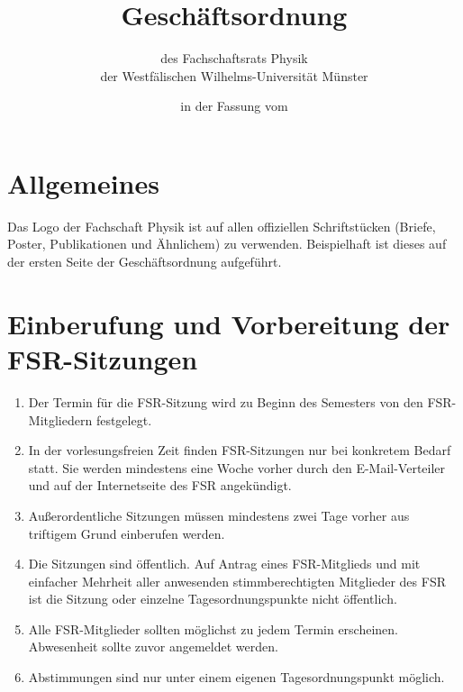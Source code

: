 \documentclass[
	a4paper,
	12pt,
	oneside,
	parskip=half-,
	pagesize,
	headsepline,
	german,
	ngerman
]{scrartcl}
\title{Geschäftsordnung}
\subtitle{des Fachschaftsrats Physik\\
der Westfälischen Wilhelms-Universität Münster}
\date{in der Fassung vom \formatdate{11}{01}{2017}}
\author{}
\begin{document}
\maketitle

\section{Allgemeines}
Das Logo der Fachschaft Physik ist auf allen offiziellen Schriftstücken (Briefe, Poster, Publikationen und Ähnlichem) zu verwenden. Beispielhaft ist dieses auf der ersten Seite der Geschäftsordnung aufgeführt.

\section{Einberufung und Vorbereitung der FSR-Sitzungen}
\begin{enumerate}
	\item Der Termin für die FSR-Sitzung wird zu Beginn des Semesters von den FSR-Mitgliedern festgelegt.
	\item In der vorlesungsfreien Zeit finden FSR-Sitzungen nur bei konkretem Bedarf statt. Sie werden mindestens eine Woche vorher durch den E-Mail-Verteiler und auf der Internetseite des FSR angekündigt.
	\item Außerordentliche Sitzungen müssen mindestens zwei Tage vorher aus triftigem Grund einberufen werden. 
	\item Die Sitzungen sind öffentlich. Auf Antrag eines FSR-Mitglieds und mit einfacher Mehrheit aller anwesenden stimmberechtigten Mitglieder des FSR ist die Sitzung oder einzelne Tagesordnungspunkte nicht öffentlich.
	\item Alle FSR-Mitglieder sollten möglichst zu jedem Termin erscheinen. Abwesenheit sollte zuvor angemeldet werden.
	\item Abstimmungen sind nur unter einem eigenen Tagesordnungspunkt möglich.
\end{enumerate}
\end{document}
